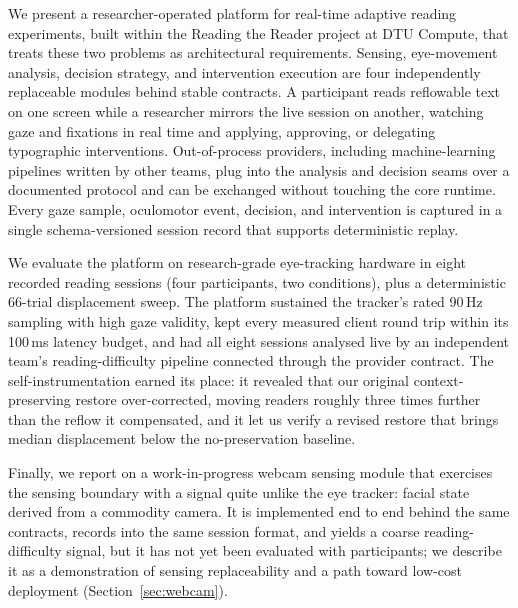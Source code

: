 We present a researcher-operated platform for real-time adaptive reading experiments, built within the Reading the Reader project at DTU Compute, that treats these two problems as architectural requirements.
Sensing, eye-movement analysis, decision strategy, and intervention execution are four independently replaceable modules behind stable contracts.
A participant reads reflowable text on one screen while a researcher mirrors the live session on another, watching gaze and fixations in real time and applying, approving, or delegating typographic interventions.
Out-of-process providers, including machine-learning pipelines written by other teams, plug into the analysis and decision seams over a documented protocol and can be exchanged without touching the core runtime.
Every gaze sample, oculomotor event, decision, and intervention is captured in a single schema-versioned session record that supports deterministic replay.

We evaluate the platform on research-grade eye-tracking hardware in eight recorded reading sessions (four participants, two conditions), plus a deterministic 66-trial displacement sweep.
The platform sustained the tracker's rated 90\,Hz sampling with high gaze validity, kept every measured client round trip within its 100\,ms latency budget, and had all eight sessions analysed live by an independent team's reading-difficulty pipeline connected through the provider contract.
The self-instrumentation earned its place: it revealed that our original context-preserving restore over-corrected, moving readers roughly three times further than the reflow it compensated, and it let us verify a revised restore that brings median displacement below the no-preservation baseline.

Finally, we report on a work-in-progress webcam sensing module that exercises the sensing boundary with a signal quite unlike the eye tracker: facial state derived from a commodity camera.
It is implemented end to end behind the same contracts, records into the same session format, and yields a coarse reading-difficulty signal, but it has not yet been evaluated with participants; we describe it as a demonstration of sensing replaceability and a path toward low-cost deployment (Section~\ref{sec:webcam}).


